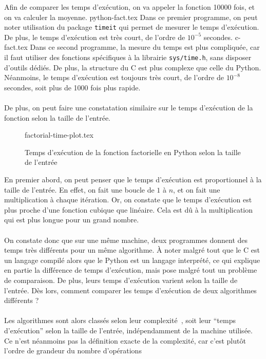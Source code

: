 Afin de comparer les temps d'exécution, on va appeler la fonction 10000 fois, et on va calculer la moyenne.
{python-fact.tex}
Dans ce premier programme, on peut noter utilisation du package \lstinline{timeit} qui permet de mesurer
le temps d'exécution.
De plus, le temps d'exécution est très court, de l'ordre de $10^{-5}$ secondes.
{c-fact.tex}
Dans ce second programme, la mesure du temps est plus compliquée, car il faut utiliser des fonctions
spécifiques à la librairie \lstinline{sys/time.h}, sans disposer d'outils dédiés.
De plus, la structure du C est plus complexe que celle du Python.
Néanmoins, le temps d'exécution est toujours très court, de l'ordre de $10^{-8}$ secondes, soit plus de 1000 fois
plus rapide.\\ \\
De plus, on peut faire une constatation similaire sur le temps d'exécution de la fonction selon la taille de
l'entrée.
\begin{figure}[H]
\centering
{factorial-time-plot.tex}
\caption{Temps d'exécution de la fonction factorielle en Python selon la taille de l'entrée}
\label{fig:fact-plot-time}
\end{figure}
En premier abord, on peut penser que le temps d'exécution est proportionnel à la taille de l'entrée.
En effet, on fait une boucle de $1$ à $n$, et on fait une multiplication à chaque itération.
Or, on constate que le temps d'exécution est plus proche d'une fonction cubique que linéaire.
Cela est dû à la multiplication qui est plus longue pour un grand nombre.\\ \\
On constate donc que sur une même machine, deux programmes donnent des temps très différents pour un même algorithme.
À noter malgré tout que le C est un langage compilé alors que le Python est un langage interprété, ce qui
explique en partie la différence de temps d'exécution, mais pose malgré tout un problème de comparaison.
De plus, leurs temps d'exécution varient selon la taille de l'entrée.
Dès lors, comment comparer les temps d'exécution de deux algorithmes différents ?\\ \\
Les algorithmes sont alors classés selon leur complexité~\cite{wiki:complexity-gen}, soit leur ``temps d'exécution'' selon la taille de
l'entrée, indépendamment de la machine utilisée.
Ce n'est néanmoins pas la définition exacte de la complexité, car c'est plutôt l'ordre de grandeur du nombre d'opérations

